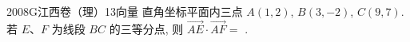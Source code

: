 
\begin{problem}{2008}{G}{江西卷（理）}{13}{向量}
直角坐标平面内三点 $ A(1, 2) $, $ B(3, -2) $, $ C(9, 7) $. 若 $ E $、$ F $ 为线段 $ BC $ 的三等分点, 则 $ \overrightarrow{AE} \cdot \overrightarrow{AF} = $ \underline{\hspace{4em}}.
\end{problem}

\begin{answer}

\end{answer}

\begin{solutions}

\end{solutions}